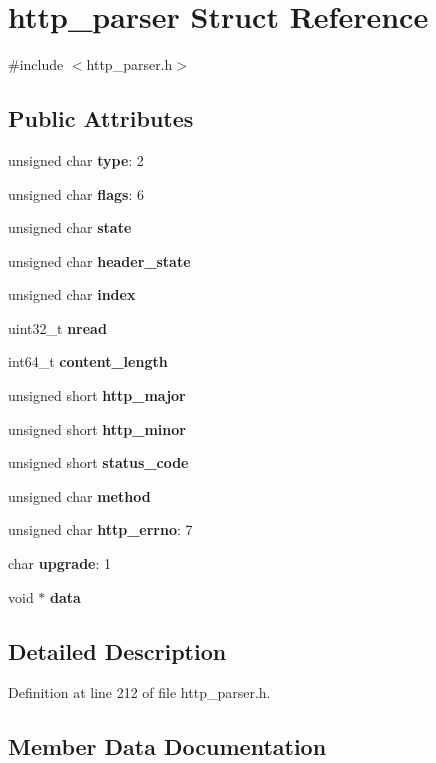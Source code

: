 \section{http\+\_\+parser Struct Reference}
\label{structhttp__parser}


{\ttfamily \#include $<$http\+\_\+parser.\+h$>$}

\subsection*{Public Attributes}
\begin{DoxyCompactItemize}
\item 
unsigned char {\bf type}\+: 2
\item 
unsigned char {\bf flags}\+: 6
\item 
unsigned char {\bf state}
\item 
unsigned char {\bf header\+\_\+state}
\item 
unsigned char {\bf index}
\item 
uint32\+\_\+t {\bf nread}
\item 
int64\+\_\+t {\bf content\+\_\+length}
\item 
unsigned short {\bf http\+\_\+major}
\item 
unsigned short {\bf http\+\_\+minor}
\item 
unsigned short {\bf status\+\_\+code}
\item 
unsigned char {\bf method}
\item 
unsigned char {\bf http\+\_\+errno}\+: 7
\item 
char {\bf upgrade}\+: 1
\item 
void $\ast$ {\bf data}
\end{DoxyCompactItemize}


\subsection{Detailed Description}


Definition at line 212 of file http\+\_\+parser.\+h.



\subsection{Member Data Documentation}
